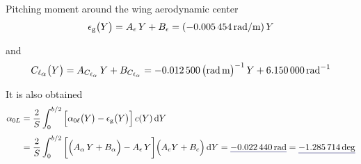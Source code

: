 \documentclass[[12pt,twoside]{book}
\begin{document}
\begin{myExampleX}{Pitching moment around the wing aerodynamic center}{}
\[
\epsilon_\mathrm{g} \big( Y \big) = A_{\epsilon} \, Y + B_{\epsilon}
  = (\SI[round-precision=5]{\myCoeffATwistWingRADMT}{\radian/\metre}) \, Y
\]

\noindent
and
\[
C_{\ell_\mathlarger{\alpha}} \big( Y \big) = A_{C_{\ell_\alpha}} \, Y + B_{C_{\ell_\alpha}}
  = \SI[round-precision=5]{\myCoeffAClalphaWingRADMT}{\big(\radian\,\metre\big)^{-1}} \, Y
    + \SI[round-precision=3]{\myCoeffBClalphaWingRAD}{\radian^{-1}}
\]

It is also obtained
\[
\begin{split}
\alpha_{0L} 
  & {}= \frac{2}{S} \int_0^{b/2} 
    \Big[ 
      \alpha_{0\ell}\big(Y\big) - \epsilon_\mathrm{g}\big(Y\big) 
    \Big] \, c(Y) \diff{Y}
\\[3pt]
  & {}= \frac{2}{S} \int_0^{b/2} 
    \bigg[ \Big( A_{\alpha} \, Y + B_{\alpha} \Big) - A_{\epsilon} \, Y \bigg] \Big( A_c Y + B_c \Big)
      \diff{Y}
  = \mathunderline{mydarkblue}{ \SI[round-precision=4]{\myAlphaZeroLiftWingRAD}{\radian} }
  = \mathunderline{mydarkblue}{ \SI[round-precision=1]{\myAlphaZeroLiftWingDEG}{\deg} }
\end{split}
\]


\end{myExampleX}
\end{document}
